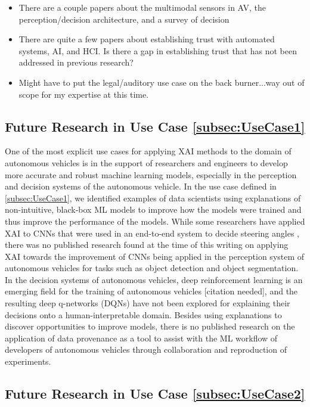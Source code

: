 \begin{itemize}
    \item There are a couple papers about the multimodal sensors in AV, the perception/decision architecture, and a survey of decision 
    \item There are quite a few papers about establishing trust with automated systems, AI, and HCI.  Is there a gap in establishing trust that has not been addressed in previous research?
    \item Might have to put the legal/auditory use case on the back burner...way out of scope for my expertise at this time.
\end{itemize}

\subsection{Future Research in Use Case \ref{subsec:UseCase1}}

One of the most explicit use cases for applying XAI methods to the domain of autonomous vehicles is in the support of researchers and engineers to develop more accurate and robust machine learning models, especially in the perception and decision systems of the autonomous vehicle.  In the use case defined in \ref{subsec:UseCase1}, we identified examples of data scientists using explanations of non-intuitive, black-box ML models to improve how the models were trained and thus improve the performance of the models.  While some researchers have applied XAI to CNNs that were used in an end-to-end system to decide steering angles \cite{Bojarski2017ExplainingHA}, there was no published research found at the time of this writing on applying XAI towards the improvement of CNNs being applied in the perception system of autonomous vehicles for tasks such as object detection and object segmentation.  In the decision systems of autonomous vehicles, deep reinforcement learning is an emerging field for the training of autonomous vehicles [citation needed], and the resulting deep q-networks (DQNs) have not been explored for explaining their decisions onto a human-interpretable domain.  Besides using explanations to discover opportunities to improve models, there is no published research on the application of data provenance as a tool to assist with the ML workflow of developers of autonomous vehicles through collaboration and reproduction of experiments.

\subsection{Future Research in Use Case \ref{subsec:UseCase2}}

